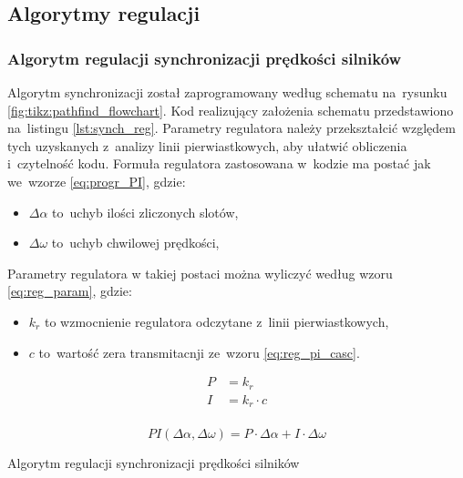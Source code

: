 \documentclass[11pt]{article}
\begin{document}
\subsection{Algorytmy regulacji}
\subsubsection{Algorytm regulacji synchronizacji prędkości silników}
Algorytm synchronizacji został zaprogramowany według schematu na~rysunku \ref{fig:tikz:pathfind_flowchart}.
Kod realizujący założenia schematu przedstawiono na~listingu \ref{lst:synch_reg}.
Parametry regulatora należy przekształcić względem tych uzyskanych z~analizy linii pierwiastkowych, aby ułatwić obliczenia i~czytelność kodu.
Formuła regulatora zastosowana w~kodzie ma postać jak we~wzorze \ref{eq:progr_PI}, gdzie:
\begin{itemize}
	\item $ \Delta \alpha $ to~uchyb ilości zliczonych slotów,
	\item $ \Delta \omega $ to~uchyb chwilowej prędkości,
\end{itemize}
Parametry regulatora w takiej postaci można wyliczyć według wzoru \ref{eq:reg_param}, gdzie:
\begin{itemize}
	\item $ k_r $ to wzmocnienie regulatora odczytane z~linii pierwiastkowych,
	\item $ c $ to~wartość zera transmitacnji ze~wzoru \ref{eq:reg_pi_casc}.
\end{itemize}

\begin{equation} \label{eq:reg_param}
\begin{aligned}
	P &=  k_r\\
	I &=  k_r \cdot c\\
\end{aligned}
\end{equation}

\begin{equation} \label{eq:progr_PI}
	PI \left( \Delta \alpha, \Delta \omega \right) = P \cdot \Delta \alpha + I \cdot \Delta \omega
\end{equation}

\begin{listing}[htb]
\caption{Algorytm regulacji synchronizacji prędkości silników}
\inputminted[firstline=161, lastline=183, frame=lines, linenos, breaklines]{cpp}{../src/platformMotors.cpp}
\label{lst:synch_reg}
\end{listing}
\end{document}
